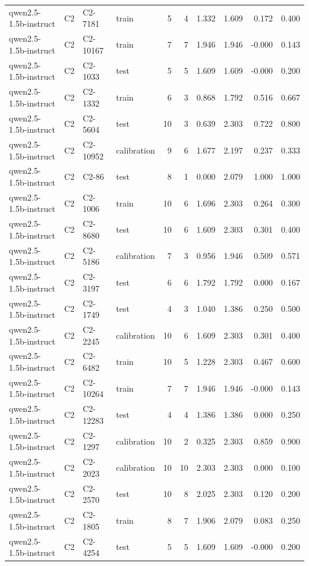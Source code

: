 \begin{table}
\begin{tabular}{llllrrrrrr}
qwen2.5-1.5b-instruct & C2 & C2-7181 & train & 5 & 4 & 1.332 & 1.609 & 0.172 & 0.400 \\
qwen2.5-1.5b-instruct & C2 & C2-10167 & train & 7 & 7 & 1.946 & 1.946 & -0.000 & 0.143 \\
qwen2.5-1.5b-instruct & C2 & C2-1033 & test & 5 & 5 & 1.609 & 1.609 & -0.000 & 0.200 \\
qwen2.5-1.5b-instruct & C2 & C2-1332 & train & 6 & 3 & 0.868 & 1.792 & 0.516 & 0.667 \\
qwen2.5-1.5b-instruct & C2 & C2-5604 & test & 10 & 3 & 0.639 & 2.303 & 0.722 & 0.800 \\
qwen2.5-1.5b-instruct & C2 & C2-10952 & calibration & 9 & 6 & 1.677 & 2.197 & 0.237 & 0.333 \\
qwen2.5-1.5b-instruct & C2 & C2-86 & test & 8 & 1 & 0.000 & 2.079 & 1.000 & 1.000 \\
qwen2.5-1.5b-instruct & C2 & C2-1006 & train & 10 & 6 & 1.696 & 2.303 & 0.264 & 0.300 \\
qwen2.5-1.5b-instruct & C2 & C2-8680 & test & 10 & 6 & 1.609 & 2.303 & 0.301 & 0.400 \\
qwen2.5-1.5b-instruct & C2 & C2-5186 & calibration & 7 & 3 & 0.956 & 1.946 & 0.509 & 0.571 \\
qwen2.5-1.5b-instruct & C2 & C2-3197 & test & 6 & 6 & 1.792 & 1.792 & 0.000 & 0.167 \\
qwen2.5-1.5b-instruct & C2 & C2-1749 & test & 4 & 3 & 1.040 & 1.386 & 0.250 & 0.500 \\
qwen2.5-1.5b-instruct & C2 & C2-2245 & calibration & 10 & 6 & 1.609 & 2.303 & 0.301 & 0.400 \\
qwen2.5-1.5b-instruct & C2 & C2-6482 & train & 10 & 5 & 1.228 & 2.303 & 0.467 & 0.600 \\
qwen2.5-1.5b-instruct & C2 & C2-10264 & train & 7 & 7 & 1.946 & 1.946 & -0.000 & 0.143 \\
qwen2.5-1.5b-instruct & C2 & C2-12283 & test & 4 & 4 & 1.386 & 1.386 & 0.000 & 0.250 \\
qwen2.5-1.5b-instruct & C2 & C2-1297 & calibration & 10 & 2 & 0.325 & 2.303 & 0.859 & 0.900 \\
qwen2.5-1.5b-instruct & C2 & C2-2023 & calibration & 10 & 10 & 2.303 & 2.303 & 0.000 & 0.100 \\
qwen2.5-1.5b-instruct & C2 & C2-2570 & test & 10 & 8 & 2.025 & 2.303 & 0.120 & 0.200 \\
qwen2.5-1.5b-instruct & C2 & C2-1805 & train & 8 & 7 & 1.906 & 2.079 & 0.083 & 0.250 \\
qwen2.5-1.5b-instruct & C2 & C2-4254 & test & 5 & 5 & 1.609 & 1.609 & -0.000 & 0.200 \\

\end{tabular}
\end{table}
